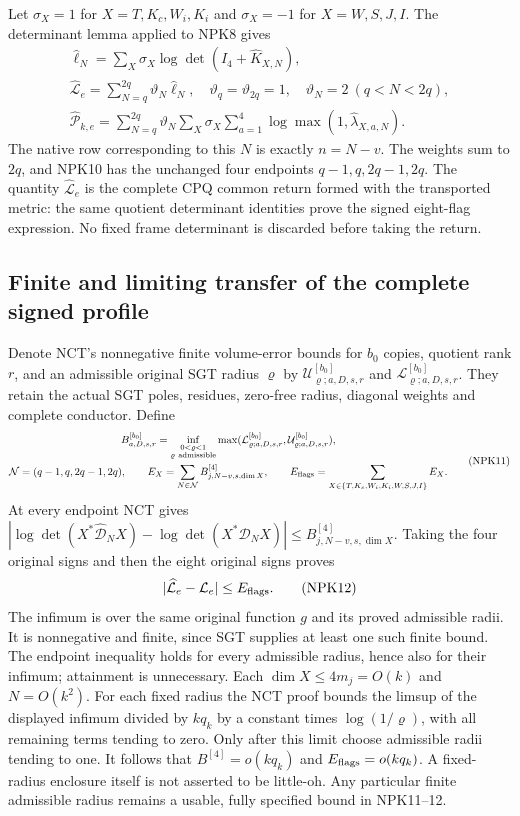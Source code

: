 \documentclass[11pt,a4paper]{article}
\begin{document}
Let $\sigma_X=1$ for $X=T,K_c,W_i,K_i$ and $\sigma_X=-1$
for $X=W,S,J,I$. The determinant lemma applied to NPK8 gives
\[
 \begin{gathered}
 \widehat\ell_N=\sum_X\sigma_X\log\det(I_4+\widehat K_{X,N}),\\
 \widehat{\mathcal L}_e=\sum_{N=q}^{2q}\vartheta_N\widehat\ell_N,
 \quad \vartheta_q=\vartheta_{2q}=1,\quad
 \vartheta_N=2\ (q<N<2q),\\
 \widehat{\mathcal P}_{k,e}=
 \sum_{N=q}^{2q}\vartheta_N\sum_X\sigma_X
       \sum_{a=1}^4\log\max(1,\widehat\lambda_{X,a,N}).
 \end{gathered}\tag{NPK10}
\]
The native row corresponding to this $N$ is exactly $n=N-v$.
The weights sum to $2q$, and NPK10 has the unchanged four
endpoints $q-1,q,2q-1,2q$. The quantity
$\widehat{\mathcal L}_e$ is the complete CPQ common return
formed with the transported metric: the same quotient
determinant identities prove the signed eight-flag expression.
No fixed frame determinant is discarded before taking the return.

\subsection{Finite and limiting transfer of the complete signed profile}
Denote NCT's nonnegative finite volume-error bounds for $b_0$ copies,
quotient rank $r$, and an admissible original SGT radius $\varrho$
by $\mathcal U^{[b_0]}_{\varrho;a,D,s,r}$ and
$\mathcal L^{[b_0]}_{\varrho;a,D,s,r}$. They retain the actual SGT poles,
residues, zero-free radius, diagonal weights and complete conductor.
Define
\[
 \begin{gathered}
 B^{[b_0]}_{a,D,s,r}=\inf_{\substack{0<\varrho<1\\
                         \varrho\ \mathrm{admissible}}}
 \max(\mathcal L^{[b_0]}_{\varrho;a,D,s,r},
      \mathcal U^{[b_0]}_{\varrho;a,D,s,r}),\\
 \mathcal N=(q-1,q,2q-1,2q),\qquad
 E_X=\sum_{N\in\mathcal N}B^{[4]}_{j,N-v,s,\dim X},\qquad
 E_{\rm flags}=\sum_{X\in\{T,K_c,W_i,K_i,W,S,J,I\}}E_X.
 \end{gathered}\tag{NPK11}
\]
At every endpoint NCT gives
$|\log\det(X^*\widehat{\mathcal D}_NX)
 -\log\det(X^*\mathcal D_NX)|\le B^{[4]}_{j,N-v,s,\dim X}$.
Taking the four original signs and then the eight original signs
proves
\[
 |\widehat{\mathcal L}_e-\mathcal L_e|\le E_{\rm flags}.
 \tag{NPK12}
\]
The infimum is over the same original function $g$ and its proved
admissible radii. It is nonnegative and finite, since SGT supplies
at least one such finite bound. The endpoint inequality holds for
every admissible radius, hence also for their infimum; attainment
is unnecessary. Each $\dim X\le4m_j=O(k)$ and $N=O(k^2)$.
For each fixed radius the NCT proof bounds the limsup of the
displayed infimum divided by $kq_k$ by a constant times
$\log(1/\varrho)$, with all remaining terms tending to zero.
Only after this limit choose admissible radii tending to one.
It follows that $B^{[4]}=o(kq_k)$ and
$E_{\rm flags}=o(kq_k)$. A fixed-radius enclosure itself is
not asserted to be little-oh. Any particular finite admissible
radius remains a usable, fully specified bound in NPK11--12.
\end{document}
